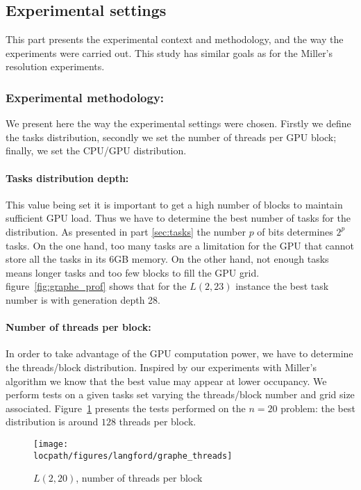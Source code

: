 \subsection{Experimental settings}
This part presents the experimental context and methodology, and the way the experiments were carried out.
This study has similar goals as for the Miller's resolution experiments.

\subsubsection{Experimental methodology: }
We present here the way the experimental settings were chosen.
Firstly we define the tasks distribution, secondly we set the number of threads per GPU block; finally, we set the CPU/GPU distribution.


\paragraph{Tasks distribution depth: }
This value being set it is important to get a high number of blocks to maintain sufficient GPU load.
Thus we have to determine the best number of tasks for the distribution. As presented in part \ref{sec:tasks} the number $p$ of bits determines $2^p$ tasks. On the one hand, too many tasks are a limitation for the GPU that cannot store all the tasks in its 6GB memory. On the other hand, not enough tasks means longer tasks and too few blocks to fill the GPU grid. figure~\ref{fig:graphe_prof} shows that for the $L(2,23)$ instance the best task number is with generation depth 28.


\paragraph{Number of threads per block: }
In order to take advantage of the GPU computation power, we have to determine the threads/block distribution. Inspired by our experiments with Miller's algorithm we know that the best value may appear at lower occupancy. We perform tests on a given tasks set varying the threads/block number and grid size associated. 
Figure~\ref{fig:graphe_threads} presents the tests performed on the $n=20$ problem: the best distribution is around $128$ threads per block. 
\begin{figure}[htbp]
\centering 
\texttt{[image: \\locpath/figures/langford/graphe\_threads]}
\caption{$L(2,20)$, number of threads per block}
\label{fig:graphe_threads}
\end{figure}

